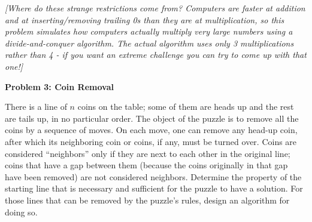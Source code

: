 \documentclass[]{article}
\begin{document}
\textit{[Where do these strange restrictions come from? Computers are faster at addition and at inserting/removing trailing
0s than they are at multiplication, so this problem simulates how computers actually multiply very large numbers
using a divide-and-conquer algorithm. The actual algorithm uses only 3 multiplications rather than 4 - if you want
an extreme challenge you can try to come up with that one!]}

\medskip
\textbf{Problem 3: Coin Removal}

There is a line of $n$ coins on the table; some of them are heads up and the rest are tails up, in no particular
order. The object of the puzzle is to remove all the coins by a sequence of moves. On each move, one can
remove any head-up coin, after which its neighboring coin or coins, if any, must be turned over. Coins are
considered ``neighbors'' only if they are next to each other in the original line; coins that have a gap between them
(because the coins originally in that gap have been removed) are not considered neighbors.
Determine the property of the starting line that is necessary and sufficient for the puzzle to have a
solution. For those lines that can be removed by the puzzle's rules, design an algorithm for doing so.
\end{document}
